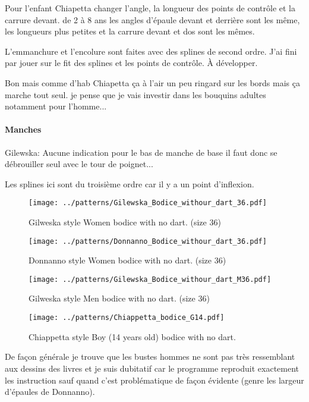 \documentclass[11pt,a4paper]{article}
\begin{document}
Pour l'enfant Chiapetta changer l'angle, la longueur des points de contrôle et la carrure devant. de 2 à 8 ans les angles d'épaule devant et derrière sont les même, les longueurs plus petites et la carrure devant et dos sont les mêmes.

L'emmanchure et l'encolure sont faites avec des splines de second ordre. J'ai fini par jouer sur le fit des splines et les points de contrôle. À développer.

Bon mais comme d'hab Chiapetta ça à l'air un peu ringard sur les bords mais ça marche tout seul. je pense que je vais investir dans 
les bouquins adultes notamment pour l'homme...


\paragraph{Manches}
Gilewska: Aucune indication pour le bas de manche de base il faut donc 
se débrouiller seul avec le tour de poignet... 

Les splines ici sont du troisième ordre car il y a un point d'inflexion. 

\begin{figure}[hbtp]
\centering
\texttt{[image: ../patterns/Gilewska\_Bodice\_withour\_dart\_36.pdf]}
\caption{Gilweska style Women bodice with no dart. (size 36)}
\end{figure}

\begin{figure}[hbtp]
\centering
\texttt{[image: ../patterns/Donnanno\_Bodice\_withour\_dart\_36.pdf]}
\caption{Donnanno style Women bodice with no dart. (size 36)}
\end{figure}

\begin{figure}[hbtp]
\centering
\texttt{[image: ../patterns/Gilewska\_Bodice\_withour\_dart\_M36.pdf]}
\caption{Gilweska style Men bodice with no dart. (size 36)}
\end{figure}

\begin{figure}[hbtp]
\centering
\texttt{[image: ../patterns/Chiappetta\_bodice\_G14.pdf]}
\caption{Chiappetta style Boy (14 years old) bodice with no dart.}
\label{fig:CB14}
\end{figure}

De façon générale je trouve que les bustes hommes ne sont pas très ressemblant aux dessins des livres et je suis dubitatif car le programme reproduit exactement les instruction sauf quand c'est problématique de façon évidente (genre les largeur d'épaules de Donnanno).
\end{document}
